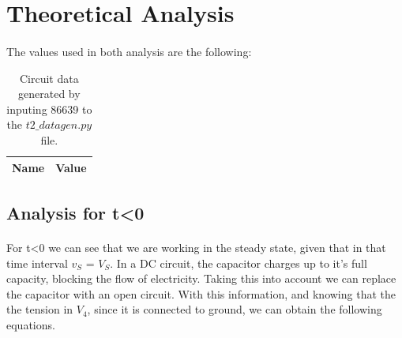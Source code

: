 \section{Theoretical Analysis}
\label{sec:analysis}

\paragraph{} The values used in both analysis are the following:


\begin{table}[h]
  \centering
  \begin{tabular}{|l|r|}
    \hline
    {\bf Name} & {\bf Value} \\ \hline
    
  \end{tabular}
  \caption{Circuit data generated by inputing 86639 to the $t2\_datagen.py$ file.}                                                            
  \label{tab:data}                                                      
\end{table}   

\subsection{Analysis for t<0}

\paragraph{} For t<0 we can see that we are working in the steady state, given that in that time interval $v_S$ = $V_S$. In a DC circuit, the capacitor charges up to it's full capacity, blocking the flow of electricity. Taking 
this into account we can replace the capacitor with an open circuit. With this information, and knowing that the the tension in $V_4$, since it is connected to ground, we can obtain the following equations.

